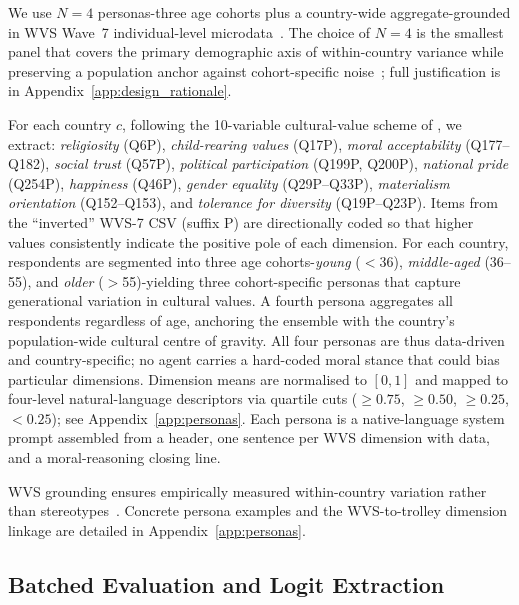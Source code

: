 \documentclass{article}
\begin{document}
We use $N{=}4$ personas-three age cohorts plus a country-wide aggregate-grounded
in WVS Wave~7 individual-level microdata~\citep{haerpfer2022wvs}. The choice
of $N{=}4$ is the smallest panel that covers the primary demographic axis of
within-country variance while preserving a population anchor against
cohort-specific noise~\citep{inglehart2005modernization, kish1965survey}; full
justification is in Appendix~\ref{app:design_rationale}.

For each country $c$, following the 10-variable cultural-value scheme of
\citet{greco2026personas}, we extract:
\emph{religiosity} (Q6P), \emph{child-rearing values} (Q17P),
\emph{moral acceptability} (Q177--Q182),
\emph{social trust} (Q57P), \emph{political participation} (Q199P, Q200P),
\emph{national pride} (Q254P), \emph{happiness} (Q46P),
\emph{gender equality} (Q29P--Q33P),
\emph{materialism orientation} (Q152--Q153), and
\emph{tolerance for diversity} (Q19P--Q23P).
Items from the ``inverted'' WVS-7 CSV (suffix P) are directionally coded so that
higher values consistently indicate the positive pole of each dimension.
For each country, respondents are segmented into three age cohorts-\emph{young}
($<$36), \emph{middle-aged} (36--55), and \emph{older} ($>$55)-yielding three
cohort-specific personas that capture generational variation in cultural values.
A fourth persona aggregates all respondents regardless of age, anchoring the
ensemble with the country's population-wide cultural centre of gravity.
All four personas are thus data-driven and country-specific; no agent carries a
hard-coded moral stance that could bias particular dimensions.
Dimension means are normalised to $[0,1]$ and mapped to four-level
natural-language descriptors via quartile cuts ($\geq 0.75$, $\geq 0.50$,
$\geq 0.25$, $< 0.25$); see Appendix~\ref{app:personas}.
Each persona is a native-language system prompt assembled from a header, one
sentence per WVS dimension with data, and a moral-reasoning closing line.

\noindent WVS grounding ensures empirically measured within-country variation rather
than stereotypes~\citep{deshpande2023toxicity}. Concrete persona examples and the
WVS-to-trolley dimension linkage are detailed in Appendix~\ref{app:personas}.

\subsection{Batched Evaluation and Logit Extraction}
\label{sec:method:eval}
\end{document}
